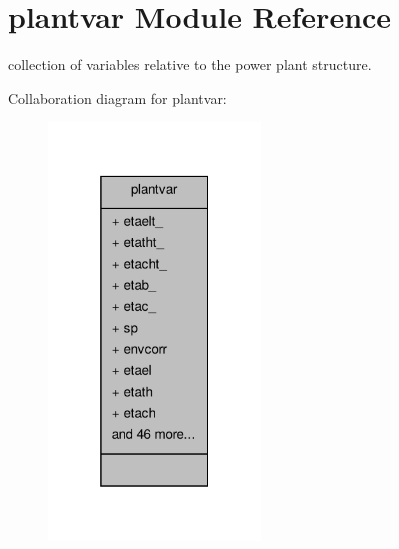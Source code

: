 \hypertarget{classplantvar}{\section{plantvar Module Reference}
\label{classplantvar}
}


collection of variables relative to the power plant structure.  




Collaboration diagram for plantvar\-:
\nopagebreak
\begin{figure}[H]
\begin{center}
\leavevmode
\includegraphics[width=160pt]{classplantvar__coll__graph}
\end{center}
\end{figure}
